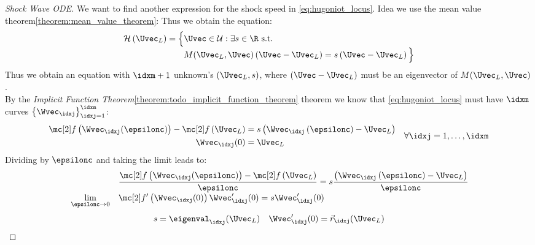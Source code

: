 \begin{proofbox}\nospacing
    \begin{proof}[Shock Wave ODE]\label{proof:defn:shock_wave_ode}
        We want to find another expression for the shock speed in \cref{eq:hugoniot_locus}.
        Idea we use the mean value theorem\cref{theorem:mean_value_theorem}:
      Thus we obtain the equation:
      \begin{align}
          \mathcal{H}\left(\Uvec_{L}\right)=\Big\{&\Uvec\in\admissibleset:\exists s\in\R\text{ s.t. }\nonumber\\[-1\jot]
          &M(\Uvec_{L},\Uvec)\left(\Uvec-\Uvec_{L}\right)=s \left(\Uvec-\Uvec_{L}\right)\Big\}\label{eq:hugoniot_locus_proof}
      \end{align}
      Thus we obtain an equation with $\idxm+1$ unknown's $(\Uvec_{L},s)$, where $\left(\Uvec-\Uvec_{L}\right)$ must be an eigenvector of $M(\Uvec_{L},\Uvec)$.\\
      By the \textit{Implicit Function Theorem}\cref{theorem:todo_implicit_function_theorem} theorem we know that
      \cref{eq:hugoniot_locus} must have $\idxm$ curves $\left\{\Wvec_{\idxj}\right\}_{\idxj=1}^{\idxm}$:
      \begin{align}
        \begin{aligned}
            \flux \left(\Wvec_{\idxj}(\epsilonc)\right)-\flux \left(\Uvec_{L}\right)&=s \left(\Wvec_{\idxj}\left(\epsilonc\right)-\Uvec_{L}\right)\\
            \Wvec_{\idxj}(0)&=\Uvec_{L}
        \end{aligned}&&\forall\idxj=1,\ldots,\idxm
      \end{align}
      Dividing by $\epsilonc$ and taking the limit leads to:
      \begin{align*}
        &&&\frac{\flux \left(\Wvec_{\idxj}(\epsilonc)\right)-\flux \left(\Uvec_{L}\right)}{\epsilonc}=s \frac{\left(\Wvec_{\idxj}\left(\epsilonc\right)-\Uvec_{L}\right)}{\epsilonc}\\[-1\jot]
        &\lim_{\epsilonc\to0}&&\flux'\left(\Wvec_{\idxj}(0)\right)\Wvec'_{\idxj}(0)=s\Wvec'_{\idxj}(0)
      \end{align*}
      \begin{align*}
        s=\eigenval_{\idxj}(\Uvec_{L})&&\Wvec_{\idxj}'(0)=\vec{r}_{\idxj}(\Uvec_{L})
      \end{align*}
    \end{proof}
\end{proofbox}
